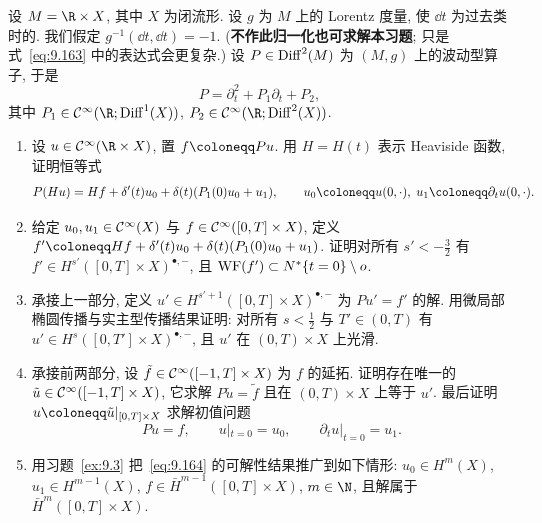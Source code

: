 \begin{exer}[由强迫问题得到初值问题]\label{ex:9.10}
设 $M = \R \times X$, 其中 $X$ 为闭流形. 设 $g$ 为 $M$ 上的 Lorentz 度量, 使 $\dd t$ 为过去类时的. 我们假定 $g^{-1}(\dd t, \dd t) = -1$. (\textbf{不作此归一化也可求解本习题}; 只是式~\eqref{eq:9.163} 中的表达式会更复杂.) 设 $P \in \operatorname{Diff}^2(M)$ 为 $(M, g)$ 上的波动型算子, 于是
\begin{equation}\label{eq:9.162}
    P = \partial_t^2 + P_1 \partial_t + P_2,
\end{equation}
其中 $P_1 \in \Smooth(\R; \Diff^1(X))$, $P_2 \in \Smooth(\R; \Diff^2(X))$.
\begin{enumerate}[label=(\arabic*)]
    \item 设 $u \in \Smooth(\R \times X)$, 置 $f \defeq P u$. 用 $H = H(t)$ 表示 Heaviside 函数, 证明恒等式
    \begin{equation}\label{eq:9.163}
        P(Hu) = Hf + \delta'(t) u_0 + \delta(t)(P_1(0) u_0 + u_1), \qquad u_0 \defeq u(0, \cdot), \; u_1 \defeq \partial_t u(0, \cdot).
    \end{equation}
    \item 给定 $u_0, u_1 \in \mathcal{C}^\infty(X)$ 与 $f \in \mathcal{C}^\infty([0, T] \times X)$, 定义 $f' \defeq Hf + \delta'(t)u_0 + \delta(t)(P_1(0)u_0 + u_1)$. 证明对所有 $s' < -\frac32$ 有 $f' \in H^{s'}([0, T] \times X)^{\bullet,-}$, 且 $\operatorname{WF}(f') \subset N^*\{t = 0\} \setminus o$.
    \item 承接上一部分, 定义 $u' \in H^{s'+1}([0, T] \times X)^{\bullet,-}$ 为 $P u' = f'$ 的解. 用微局部椭圆传播与实主型传播结果证明: 对所有 $s < \frac12$ 与 $T' \in (0, T)$ 有 $u' \in H^s([0, T'] \times X)^{\bullet,-}$, 且 $u'$ 在 $(0, T) \times X$ 上光滑.
    \item 承接前两部分, 设 $\tilde f \in \mathcal{C}^\infty([-1, T] \times X)$ 为 $f$ 的延拓. 证明存在唯一的 $\tilde u \in \mathcal{C}^\infty([-1, T] \times X)$, 它求解 $P \tilde u = \tilde f$ 且在 $(0, T) \times X$ 上等于 $u'$. 最后证明 $u \defeq \tilde u|_{[0,T] \times X}$ 求解初值问题
    \begin{equation}\label{eq:9.164}
        P u = f, \qquad u|_{t=0} = u_0, \qquad \partial_t u|_{t=0} = u_1.
    \end{equation}
    \item 用习题~\ref{ex:9.3} 把~\eqref{eq:9.164} 的可解性结果推广到如下情形: $u_0 \in H^m(X)$, $u_1 \in H^{m-1}(X)$, $f \in \bar{H}^{m-1}([0, T] \times X)$, $m \in \N$, 且解属于 $\bar{H}^m([0, T] \times X)$.
\end{enumerate}
\end{exer}

